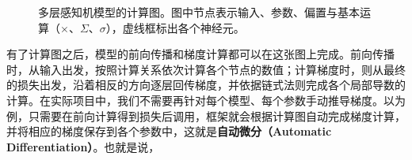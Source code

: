 \begin{figure}[H]
    \caption{多层感知机模型的计算图。图中节点表示输入、参数、偏置与基本运算（$\times$、$\Sigma$、$\sigma$），虚线框标出各个神经元。}
    \label{fig:computational_graph}
\end{figure}

有了计算图之后，模型的前向传播和梯度计算都可以在这张图上完成。前向传播时，从输入出发，按照计算关系依次计算各个节点的数值；计算梯度时，则从最终的损失出发，沿着相反的方向逐层回传梯度，并依据链式法则完成各个局部导数的计算。在实际项目中，我们不需要再针对每个模型、每个参数手动推导梯度。以为例，只需要在前向计算得到损失后调用，框架就会根据计算图自动完成梯度计算，并将相应的梯度保存到各个参数中，这就是\textbf{自动微分（Automatic Differentiation）}。也就是说，

